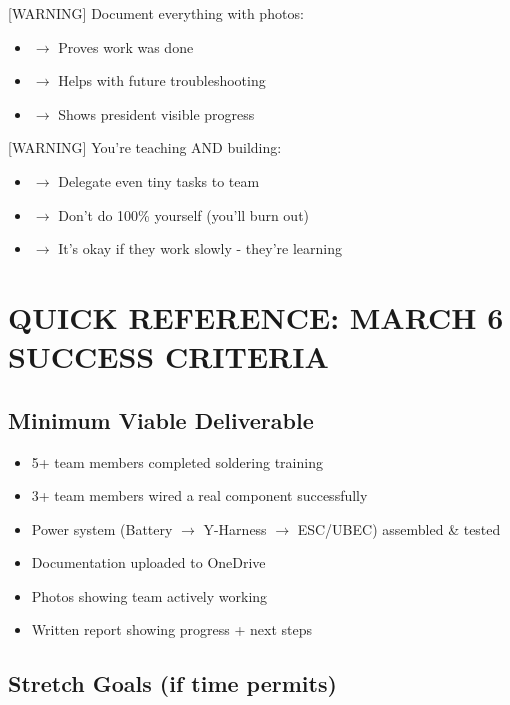 \documentclass[11pt,letterpaper]{article}
\begin{document}
{{{{[WARNING]  Document everything with photos:\par

\begin{itemize}
  \item $\rightarrow$ Proves work was done
  \item $\rightarrow$ Helps with future troubleshooting
  \item $\rightarrow$ Shows president visible progress
\end{itemize}

[WARNING]  You're teaching AND building:\par

\begin{itemize}
  \item $\rightarrow$ Delegate even tiny tasks to team
  \item $\rightarrow$ Don't do 100\% yourself (you'll burn out)
  \item $\rightarrow$ It's okay if they work slowly - they're learning
\end{itemize}

\section{QUICK REFERENCE: MARCH 6 SUCCESS CRITERIA}

\subsection{Minimum Viable Deliverable}

\begin{itemize}
  \item [DONE] 5+ team members completed soldering training
  \item [DONE] 3+ team members wired a real component successfully
  \item [DONE] Power system (Battery $\rightarrow$ Y-Harness $\rightarrow$ ESC/UBEC) assembled \& tested
  \item [DONE] Documentation uploaded to OneDrive
  \item [DONE] Photos showing team actively working
  \item [DONE] Written report showing progress + next steps
\end{itemize}

\subsection{Stretch Goals (if time permits)}

}}}}
\end{document}
